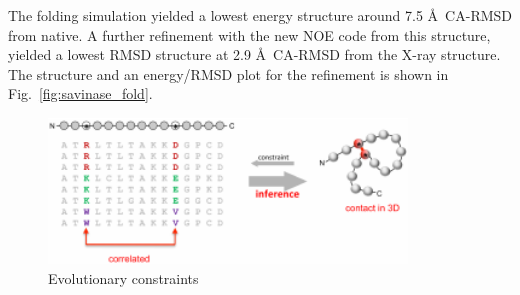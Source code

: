 The folding simulation yielded a lowest energy structure around 7.5 \AA~CA-RMSD from native. A further refinement with the new NOE code from this structure, yielded a lowest RMSD structure at 2.9 \AA~CA-RMSD from the X-ray structure.
The structure and an energy/RMSD plot for the refinement is shown in Fig.~\ref{fig:savinase_fold}.

\begin{figure}
    \includegraphics[width=0.85\textwidth]{figures/evo_constraint.pdf}
    \caption{Evolutionary constraints}
    \label{fig:evo_constraint}
\end{figure}





% 
% 

